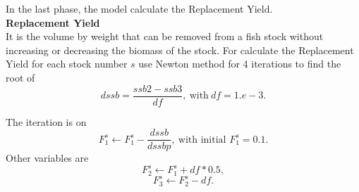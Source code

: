 \documentclass{article}
\begin{document}








In the last phase, the model calculate the Replacement Yield.\\

\textbf{Replacement Yield}\\
It is the volume by weight that can be removed from a fish stock without increasing or decreasing the biomass of the stock.
For calculate the Replacement Yield for each stock  number $s$ use Newton method for 4 iterations to find the root of 
\begin{equation}
    dssb   = \dfrac{ssb2 - ssb3}{df}, \ \text{with} \  df=1.e-3.
\end{equation}

The iteration is on
\begin{equation}
    F_{1}^s\leftarrow F_{1}^s-\dfrac{dssb}{dssbp}, \ \text{with initial $F_{1}^s=0.1$}.
\end{equation}
Other variables are
\begin{equation}
    F_2^s \leftarrow F_1^s+df*0.5,
\end{equation}
\begin{equation}
    F_3^s \leftarrow F_2^s -df.
\end{equation}
\end{document}
